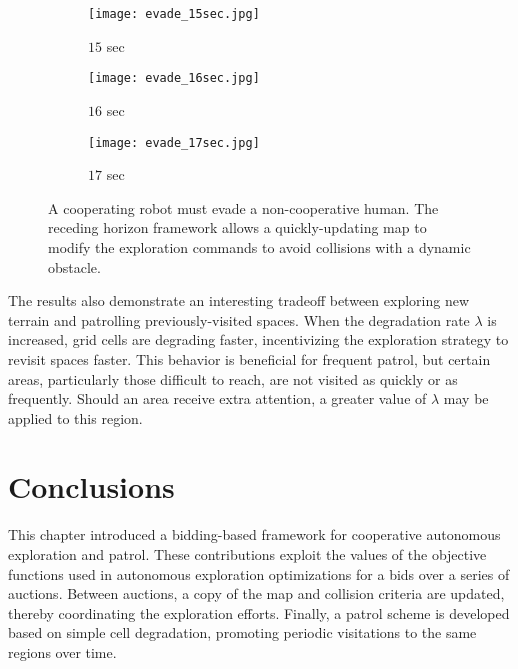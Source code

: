 \begin{figure}[!t]
\centering
    	\begin{subfigure}[t]{0.3\columnwidth}
           	\centering
          	\texttt{[image: evade\_15sec.jpg]}
        		\caption{$15$ sec}
    	\end{subfigure}
	\hspace*{0.02\textwidth}
    	\begin{subfigure}[t]{0.3\columnwidth}
           	\centering
          	\texttt{[image: evade\_16sec.jpg]}
        		\caption{$16$ sec}
    	\end{subfigure}
	\hspace*{0.02\textwidth}
    	\begin{subfigure}[t]{0.3\columnwidth}
           	\centering
          	\texttt{[image: evade\_17sec.jpg]}
        		\caption{$17$ sec}
    	\end{subfigure}
	\caption{A cooperating robot must evade a non-cooperative human. The receding horizon framework allows a quickly-updating map to modify the exploration commands to avoid collisions with a dynamic obstacle.}
	\label{fig:EvadeHuman}
\end{figure}

The results also demonstrate an interesting tradeoff between exploring new terrain and patrolling previously-visited spaces. When the degradation rate $\lambda$ is increased, grid cells are degrading faster, incentivizing the exploration strategy to revisit spaces faster. This behavior is beneficial for frequent patrol, but certain areas, particularly those difficult to reach, are not visited as quickly or as frequently. Should an area receive extra attention, a greater value of $\lambda$ may be applied to this region.



\section{Conclusions}

This chapter introduced a bidding-based framework for cooperative autonomous exploration and patrol. These contributions exploit the values of the objective functions used in autonomous exploration optimizations for a bids over a series of auctions. Between auctions, a copy of the map and collision criteria are updated, thereby coordinating the exploration efforts. Finally, a patrol scheme is developed based on simple cell degradation, promoting periodic visitations to the same regions over time.



